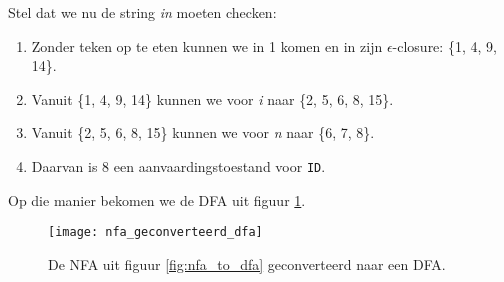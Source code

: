 \begin{itemize}
	Stel dat we nu de string \textit{in} moeten checken:
	\begin{enumerate}
		\item Zonder teken op te eten kunnen we in 1 komen en in zijn $\epsilon$-closure: {\color{red}\{1, 4, 9, 14\}}.
		\item Vanuit {\color{red}\{1, 4, 9, 14\}} kunnen we voor \textit{i} naar {\color{blue}\{2, 5, 6, 8, 15\}}.
		\item Vanuit {\color{blue}\{2, 5, 6, 8, 15\}} kunnen we voor \textit{n} naar {\color{purple}\{6, 7, 8\}}.
		\item Daarvan is 8 een aanvaardingstoestand voor \texttt{ID}.
	\end{enumerate}
	Op die manier bekomen we de DFA uit figuur \ref{fig:nfa_geconverteerd_dfa}.
	\begin{figure}[h]
		\centering
		\texttt{[image: nfa\_geconverteerd\_dfa]}
		\caption{De NFA uit figuur \ref{fig:nfa_to_dfa} geconverteerd naar een DFA.}
		\label{fig:nfa_geconverteerd_dfa}
	\end{figure}
\end{itemize}
